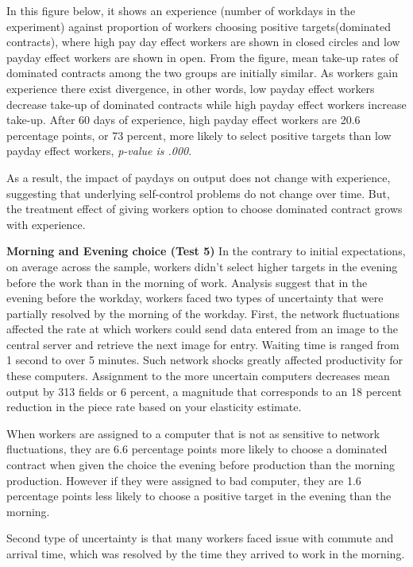 \documentclass[a4paper,12pt]{article}
\begin{document}
In this figure below, it shows an experience (number of workdays in the experiment) against proportion of workers choosing positive targets(dominated contracts), where high pay day effect workers are shown in closed circles and low payday effect workers are shown in open. From the figure, mean take-up rates of dominated contracts among the two groups are initially similar. As workers gain experience there exist divergence, in other words, low payday effect workers decrease take-up of dominated contracts while high payday effect workers increase take-up. After 60 days of experience, high payday effect workers are 20.6 percentage points, or 73 percent, more likely to select positive targets than low payday effect workers, \textit{p-value is .000}.  

As a result, the impact of paydays on output does not change with experience, suggesting that underlying self-control problems do not change over time. But, the treatment effect of giving workers option to choose dominated contract grows with experience. 

\textbf{Morning and Evening choice (Test 5)}
In the contrary to initial expectations, on average across the sample, workers didn't select higher targets in the evening before the work than in the morning of work. Analysis suggest that in the evening before  the workday, workers faced two types of uncertainty that were partially resolved by the morning of the workday. First, the network fluctuations affected the rate at which workers could send data entered from an image to the central server and retrieve the next image for entry. Waiting time is ranged from 1 second to over 5 minutes. Such network shocks greatly affected productivity for these computers. Assignment to the more uncertain computers decreases mean output by 313 fields or 6 percent, a magnitude that corresponds to an 18 percent reduction in the piece rate based on your elasticity estimate. 

When workers are assigned to a computer that is not as sensitive to network fluctuations, they are 6.6 percentage points more likely to choose a dominated contract when given the choice the evening before production than the morning production. However if they were assigned to bad computer, they are 1.6 percentage points less likely to choose a positive target in the evening than the morning.  

Second type of uncertainty is that many workers faced issue with commute and arrival time, which was resolved by the time they arrived to work in the morning. 
\end{document}
